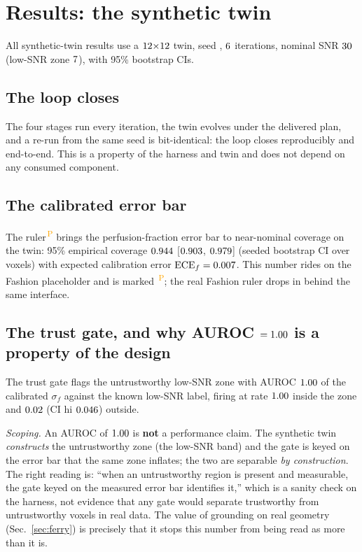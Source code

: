 \documentclass[12pt]{iopart}
\newcommand{\PROV}{\textsuperscript{\textcolor{orange}{\,P}}}
\newcommand{\sigf}{\sigma_{f}}
\begin{document}
\section{Results: the synthetic twin}\label{sec:results-syn}
All synthetic-twin results use a $12{\times}12$ twin, seed \numSeed, $6$
iterations, nominal SNR $30$ (low-SNR zone $7$), with 95\% bootstrap CIs.

\subsection{The loop closes}
The four stages run every iteration, the twin evolves under the delivered plan, and a
re-run from the same seed is bit-identical: the loop closes reproducibly and end-to-end.
This is a property of the harness and twin and does not depend on any consumed component.

\subsection{The calibrated error bar}
The ruler\PROV{} brings the perfusion-fraction error bar to near-nominal coverage on the
twin: 95\% empirical coverage $0.944$ [$0.903$, $0.979$] (seeded bootstrap CI
over voxels) with expected calibration error $\mathrm{ECE}_f=0.007$. This number rides
on the Fashion placeholder and is marked \PROV; the real Fashion ruler drops in behind the
same interface.

\subsection{The trust gate, and why AUROC $=1.00$ is a property of the design}
\label{sec:auroc}
The trust gate flags the untrustworthy low-SNR zone with AUROC $1.00$ of the
calibrated $\sigf$ against the known low-SNR label, firing at rate $1.00$ inside
the zone and $0.02$ (CI hi $0.046$) outside.

\noindent\emph{Scoping.} An AUROC of $1.00$ is \textbf{not} a performance claim. The
synthetic twin \emph{constructs} the untrustworthy zone (the low-SNR band) and the gate is
keyed on the error bar that the same zone inflates; the two are separable \emph{by
construction}. The right reading is: ``when an untrustworthy region is present and
measurable, the gate keyed on the measured error bar identifies it,'' which is a sanity
check on the harness, not evidence that any gate would separate trustworthy from
untrustworthy voxels in real data. The value of grounding on real geometry
(Sec.~\ref{sec:ferry}) is precisely that it stops this number from being read as more than
it is.
\end{document}
